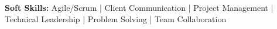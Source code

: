 \textbf{Soft Skills:} Agile/Scrum | Client Communication | Project Management | Technical Leadership | Problem Solving | Team Collaboration